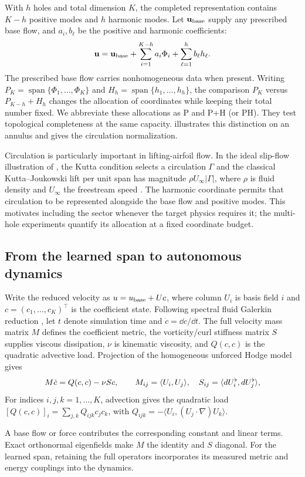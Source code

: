 With $h$ holes and total dimension $K$, the completed representation contains $K-h$ positive modes and $h$ harmonic modes. Let $\mathbf u_{\rm base}$ supply any prescribed base flow, and $a_i,b_\ell$ be the positive and harmonic coefficients:
\begin{equation}
\mathbf u=\mathbf u_{\rm base}+\sum_{i=1}^{K-h}a_i\Phi_i+\sum_{\ell=1}^{h}b_\ell h_\ell.
\label{eq:completion}
\end{equation}
The prescribed base flow carries nonhomogeneous data when present. Writing $P_K=\operatorname{span}\{\Phi_1,\ldots,\Phi_K\}$ and $H_h=\operatorname{span}\{h_1,\ldots,h_h\}$, the comparison $P_K$ versus $P_{K-h}+H_h$ changes the allocation of coordinates while keeping their total number fixed. We abbreviate these allocations as P and P+H (or PH). They test topological completeness at the same capacity.  illustrates this distinction on an annulus and gives the circulation normalization.

\begingroup
Circulation is particularly important in lifting-airfoil flow. In the ideal slip-flow illustration of , the Kutta condition selects a circulation $\Gamma$ and the classical Kutta--Joukowski lift per unit span has magnitude $\rho U_\infty|\Gamma|$, where $\rho$ is fluid density and $U_\infty$ the freestream speed \citep{batchelor2000fluid}. The harmonic coordinate permits that circulation to be represented alongside the base flow and positive modes. This motivates including the sector whenever the target physics requires it; the multi-hole experiments quantify its allocation at a fixed coordinate budget.
\par\endgroup

\subsection{From the learned span to autonomous dynamics}
{Write the reduced velocity as $u=u_{\rm base}+Uc$, where column $U_i$ is basis field $i$ and $c=(c_1,\ldots,c_K)^{\top}$ is the coefficient state. Following spectral fluid Galerkin reduction \citep{dewitt2012fluid,liu2015model}, let $t$ denote simulation time and $\dot c=\dd c/\dd t$. The full velocity mass matrix $M$ defines the coefficient metric, the vorticity/curl stiffness matrix $S$ supplies viscous dissipation, $\nu$ is kinematic viscosity, and $Q(c,c)$ is the quadratic advective load. Projection of the homogeneous unforced Hodge model gives}
\begin{equation}
M\dot c=Q(c,c)-\nu S c,\qquad
M_{ij}=\langle U_i,U_j\rangle,\quad S_{ij}=\langle dU_i^\flat,dU_j^\flat\rangle,
\label{eq:reduced-dynamics}
\end{equation}
\begingroup
For indices $i,j,k=1,\ldots,K$, advection gives the quadratic load $[Q(c,c)]_i=\sum_{j,k}Q_{ijk}c_jc_k$, with $Q_{ijk}=-\langle U_i,(U_j\cdot\nabla)U_k\rangle$.
\par\endgroup
{A base flow or force contributes the corresponding constant and linear terms. Exact orthonormal eigenfields make $M$ the identity and $S$ diagonal. For the learned span, retaining the full operators incorporates its measured metric and energy couplings into the dynamics.}


